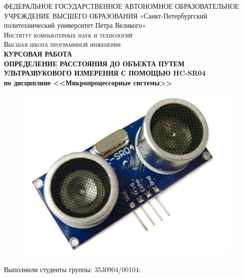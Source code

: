 \documentclass[a4paper, 14pt]{article}
\begin{document}
\begin{titlepage}
	\center

	ФЕДЕРАЛЬНОЕ ГОСУДАРСТВЕННОЕ АВТОНОМНОЕ ОБРАЗОВАТЕЛЬНОЕ УЧРЕЖДЕНИЕ ВЫСШЕГО ОБРАЗОВАНИЯ\linebreak
	«Санкт-Петербургский политехнический университет Петра Великого»\\[1cm]
	\textsc{\Large Институт компьютерных наук и технологий}\\
	\textsc{\large Высшая школа программной инженерии}\\[1.5cm]

	{ \huge \bfseries КУРСОВАЯ РАБОТА	\\
	\Large \mdseries ОПРЕДЕЛЕНИЕ РАССТОЯНИЯ ДО ОБЪЕКТА ПУТЕМ УЛЬТРАЗВУКОВОГО ИЗМЕРЕНИЯ С ПОМОЩЬЮ HC-SR04 \\
	\large по дисциплине <<Микропроцессорные системы>>}\\

	\begin{figure}[H]
		\centering
		\includegraphics[width=12cm]{screenshots/1.png}\\[2.0cm]
	\end{figure}

	\begin{multicols}{2}
		\begin{flushright} \large

			{Выполнили студенты группы: 3530904/00104:}\\
			{\phantom{qwe}}\\
			{\phantom{qwe}}\\
			{\phantom{qwe}}\\
			{\phantom{qwe}}\\


\end{flushright}
\end{multicols}
\end{titlepage}
\end{document}
